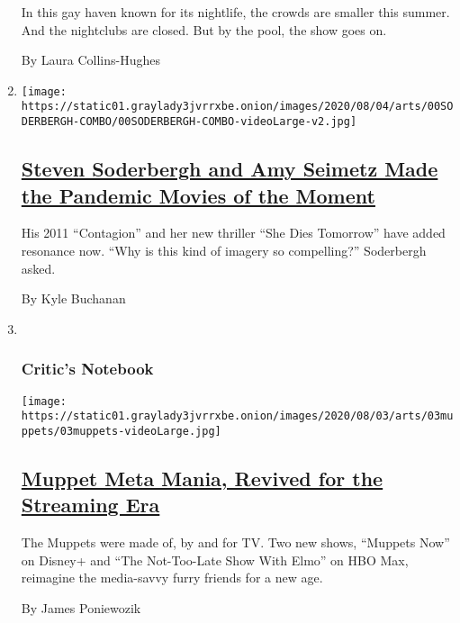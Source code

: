 \begin{enumerate}
  In this gay haven known for its nightlife, the crowds are smaller this
  summer. And the nightclubs are closed. But by the pool, the show goes
  on.

  By Laura Collins-Hughes
\item
  \texttt{[image: https://static01.graylady3jvrrxbe.onion/images/2020/08/04/arts/00SODERBERGH-COMBO/00SODERBERGH-COMBO-videoLarge-v2.jpg]}

  \hypertarget{steven-soderbergh-and-amy-seimetz-made-the-pandemic-movies-of-the-moment}{%
  \subsection{\texorpdfstring{\href{/2020/07/31/movies/steven-soderbergh-amy-seimetz-pandemic.html}{Steven
  Soderbergh and Amy Seimetz Made the Pandemic Movies of the
  Moment}}{Steven Soderbergh and Amy Seimetz Made the Pandemic Movies of the Moment}}\label{steven-soderbergh-and-amy-seimetz-made-the-pandemic-movies-of-the-moment}}

  His 2011 ``Contagion'' and her new thriller ``She Dies Tomorrow'' have
  added resonance now. ``Why is this kind of imagery so compelling?''
  Soderbergh asked.

  By Kyle Buchanan
\item ~
  \hypertarget{critics-notebook}{%
  \subsubsection{Critic's Notebook}\label{critics-notebook}}

  \texttt{[image: https://static01.graylady3jvrrxbe.onion/images/2020/08/03/arts/03muppets/03muppets-videoLarge.jpg]}

  \hypertarget{muppet-meta-mania-revived-for-the-streaming-era}{%
  \subsection{\texorpdfstring{\href{/2020/07/31/arts/television/muppets-now.html}{Muppet
  Meta Mania, Revived for the Streaming
  Era}}{Muppet Meta Mania, Revived for the Streaming Era}}\label{muppet-meta-mania-revived-for-the-streaming-era}}

  The Muppets were made of, by and for TV. Two new shows, ``Muppets
  Now'' on Disney+ and ``The Not-Too-Late Show With Elmo'' on HBO Max,
  reimagine the media-savvy furry friends for a new age.

  By James Poniewozik
\end{enumerate}

